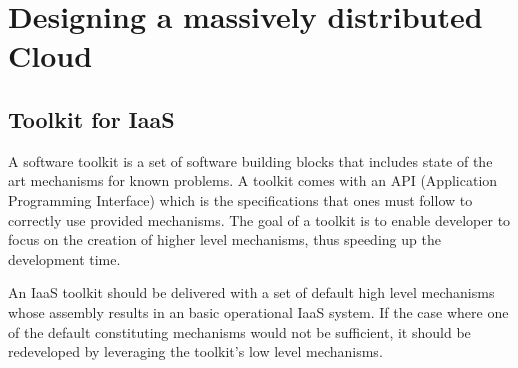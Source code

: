 \section{Designing a massively distributed Cloud}
\label{sec:design}


\subsection{Toolkit for IaaS}









A software toolkit is a set of software building blocks that includes state of 
the art mechanisms for known problems. A toolkit comes with an API (Application
Programming Interface) which is the specifications that ones must follow to
correctly use provided mechanisms. The goal of a toolkit is to enable developer
to focus on the creation of higher level mechanisms, thus speeding up the 
development time.

An IaaS toolkit should be delivered with a set of default high level mechanisms 
whose assembly results in an basic operational IaaS system. If the case where 
one of the default constituting mechanisms would not be sufficient, it should be
redeveloped by leveraging the toolkit's low level mechanisms.

